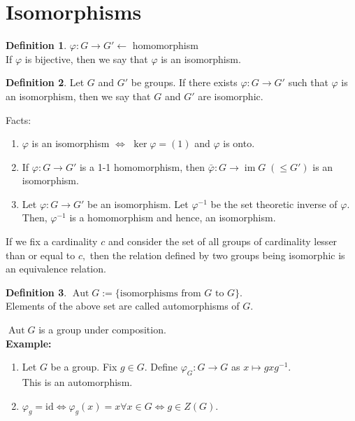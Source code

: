 \documentclass[12 pt, a4paper, toc=graduated, oneside]{article}
\theoremstyle{definition}
\newtheorem{defn}{Definition}
\newcommand{\im}{\operatorname{im}}
\begin{document}
\section{Isomorphisms}
\begin{defn}
	$\varphi : G \to G' \longleftarrow$ homomorphism\\
	If $\varphi$ is bijective, then we say that $\varphi$ is an isomorphism.
\end{defn}
\begin{defn}
	Let $G$ and $G'$ be groups. If there exists $\varphi:G \to G'$ such that $\varphi$ is an isomorphism, then we say that $G$ and $G'$ are isomorphic.
\end{defn}
Facts:
\begin{enumerate}[nosep] 
	\item $\varphi$ is an isomorphism $\iff$ $\ker \varphi = (1)$ and $\varphi$ is onto.
	\item If $\varphi:G\to G'$ is a 1-1 homomorphism, then $\bar{\varphi}:G\to \im G \;(\le G')$ is an isomorphism.
	\item Let $\varphi:G \to G'$ be an isomorphism. Let $\varphi^{-1}$ be the set theoretic inverse of $\varphi.$ Then, $\varphi^{-1}$ is a homomorphism and hence, an isomorphism.
\end{enumerate}
If we fix a cardinality $c$ and consider the set of all groups of cardinality lesser than or equal to $c,$ then the relation defined by two groups being isomorphic is an equivalence relation.
\begin{defn}
	$\operatorname{Aut} G := \{\text{isomorphisms from } G\text{ to }G\}.$\\
	Elements of the above set are called automorphisms of $G.$
\end{defn}
$\operatorname{Aut} G$ is a group under composition.\\
\textbf{Example:}
\begin{enumerate}[nosep] 
	\item Let $G$ be a group. Fix $g \in G.$ Define $\varphi_G:G \to G$ as $x \mapsto gxg^{-1}.$\\
	This is an automorphism.
	\item $\varphi_g = \text{id} \iff \varphi_g(x) = x \forall x \in G \iff g \in Z(G).$
\end{enumerate}
%
\end{document}
